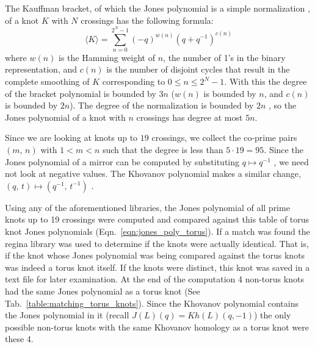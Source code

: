 \documentclass{article}
\theoremstyle{plain}
\begin{document}
        The Kauffman bracket, of which the Jones polynomial is a simple
        normalization \cite{barnatan2002khovanov},
        of a knot $K$ with $N$ crossings has the following formula:
        \begin{equation}
            \langle{K}\rangle=\sum_{n=0}^{2^{N}-1}(-q)^{w(n)}(q+q^{-1})^{c(n)}
        \end{equation}
        where $w(n)$ is the Hamming weight of $n$, the number of 1's in the
        binary representation, and $c(n)$ is the number of disjoint cycles
        that result in the complete smoothing of $K$ corresponding to
        $0\leq{n}\leq{2}^{N}-1$. With this the degree of the bracket polynomial
        is bounded by $3n$ ($w(n)$ is bounded by $n$, and $c(n)$ is bounded
        by $2n$). The degree of the normalization is bounded by $2n$
        \cite{barnatan2002khovanov}, so the
        Jones polynomial of a knot with $n$ crossings has degree at most $5n$.
        \par\hfill\par
        Since we are looking at knots up to $19$ crossings, we collect the
        co-prime pairs $(m,\,n)$ with $1<m<n$ such that the degree
        is less than $5\cdot{19}=95$. Since the Jones polynomial of a mirror
        can be computed by substituting $q\mapsto{q}^{-1}$
        \cite{jonespolyjones}, we need not look at
        negative values. The Khovanov polynomial makes a similar change,
        $(q,\,t)\mapsto(q^{-1},\,t^{-1})$
        \cite{WATSON2017915}.
        \par\hfill\par
        Using any of the aforementioned libraries, the Jones polynomial of all
        prime knots up to 19 crossings were computed and compared against this
        table of torus knot Jones polynomials (Eqn.~\ref{eqn:jones_poly_torus}).
        If a match was found the regina library was used to determine if the
        knots were actually identical. That is, if the knot whose Jones
        polynomial was being compared against the torus knots was indeed a
        torus knot itself. If the knots were distinct, this knot was saved in a
        text file for later examination. At the end of the computation 4
        non-torus knots had the same Jones polynomial as a torus knot
        (See Tab.~\ref{table:matching_torus_knots}).
        Since the Khovanov polynomial contains the Jones polynomial in it
        (recall $J(L)(q)=Kh(L)(q,-1)$) the only possible non-torus knots with
        the same Khovanov homology as a torus knot were these 4.
\end{document}
